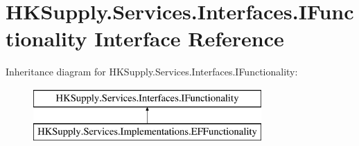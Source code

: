 \hypertarget{interface_h_k_supply_1_1_services_1_1_interfaces_1_1_i_functionality}{}\section{H\+K\+Supply.\+Services.\+Interfaces.\+I\+Functionality Interface Reference}
\label{interface_h_k_supply_1_1_services_1_1_interfaces_1_1_i_functionality}
Inheritance diagram for H\+K\+Supply.\+Services.\+Interfaces.\+I\+Functionality\+:\begin{figure}[H]
\begin{center}
\leavevmode
\includegraphics[height=2.000000cm]{interface_h_k_supply_1_1_services_1_1_interfaces_1_1_i_functionality}
\end{center}
\end{figure}
